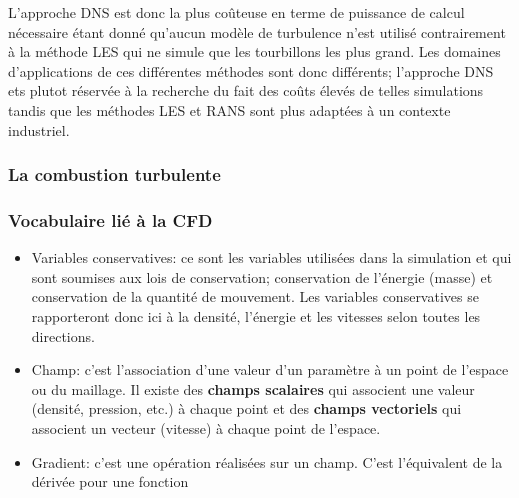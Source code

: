 L'approche DNS est donc la plus coûteuse en terme de puissance de calcul nécessaire étant donné qu'aucun modèle de turbulence n'est utilisé contrairement à la méthode LES qui ne simule que les tourbillons les plus grand. Les domaines d'applications de ces différentes méthodes sont donc différents; l'approche DNS ets plutot réservée à la recherche du fait des coûts élevés de telles simulations tandis que les méthodes LES et RANS sont plus adaptées à un contexte industriel.

\subsubsection{La combustion turbulente}


\subsubsection{Vocabulaire lié à la CFD}

\begin{itemize}
\item Variables conservatives: ce sont les variables utilisées dans la simulation et qui sont soumises aux lois de conservation; conservation de l'énergie (masse) et conservation de la quantité de mouvement. Les variables conservatives se rapporteront donc ici à la densité, l'énergie et les vitesses selon toutes les directions.
\item Champ: c'est l'association d'une valeur d'un paramètre à un point de l'espace ou du maillage. Il existe des \textbf{champs scalaires} qui associent une valeur (densité, pression, etc.) à chaque point et des \textbf{champs vectoriels} qui associent un vecteur (vitesse) à chaque point de l'espace.
\item Gradient: c'est une opération réalisées sur un champ. C'est l'équivalent de la dérivée pour une fonction

\end{itemize}
